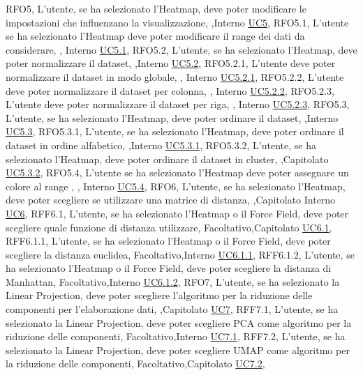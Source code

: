 {    {RFO5, L'utente{,} se ha selezionato l'Heatmap{,} deve poter modificare le impostazioni che influenzano la visualizzazione, \obb,Interno \noexpand\hyperref[uc5]{UC5}},
    {RFO5.1, L'utente se ha selezionato l'Heatmap deve poter modificare il range dei dati da considerare, \obb, Interno \noexpand\hyperref[uc5.1]{UC5.1}},
    {RFO5.2, L'utente{,} se ha selezionato l'Heatmap{,} deve poter normalizzare il dataset, \obb,Interno \noexpand\hyperref[uc5.2]{UC5.2}},
    {RFO5.2.1, L'utente deve poter normalizzare il dataset in modo globale, \obb, Interno \noexpand\hyperref[uc5.2.1]{UC5.2.1}},
    {RFO5.2.2, L'utente deve poter normalizzare il dataset per colonna, \obb, Interno \noexpand\hyperref[uc5.2.2]{UC5.2.2}},
    {RFO5.2.3, L'utente deve poter normalizzare il dataset per riga, \obb, Interno \noexpand\hyperref[uc5.2.3]{UC5.2.3}},
    {RFO5.3, L'utente{,} se ha selezionato l'Heatmap{,} deve poter ordinare il dataset, \obb,Interno \noexpand\hyperref[uc5.3]{UC5.3}},
    {RFO5.3.1, L'utente{,} se ha selezionato l'Heatmap{,} deve poter ordinare il dataset in ordine alfabetico, \obb,Interno \noexpand\hyperref[uc5.3.1]{UC5.3.1}},
    {RFO5.3.2, L'utente{,} se ha selezionato l'Heatmap{,} deve poter ordinare il dataset in cluster, \obb,Capitolato \noexpand\hyperref[uc5.3.2]{UC5.3.2}},
    {RFO5.4, L'utente se ha selezionato l'Heatmap deve poter assegnare un colore al range , \obb, Interno \noexpand\hyperref[uc5.4]{UC5.4}},
    {RFO6, L'utente{,} se ha selezionato l'Heatmap{,} deve poter scegliere se utilizzare una matrice di distanza, \obb,Capitolato Interno \noexpand\hyperref[uc6]{UC6}},
    {RFF6.1, L'utente{,} se ha selezionato l'Heatmap o il Force Field{,} deve poter scegliere quale funzione di distanza utilizzare, Facoltativo,Capitolato \noexpand\hyperref[uc6.1]{UC6.1}},
    {RFF6.1.1, L'utente{,} se ha selezionato l'Heatmap o il Force Field{,} deve poter scegliere la distanza euclidea, Facoltativo,Interno \noexpand\hyperref[uc6.1.1]{UC6.1.1}},
    {RFF6.1.2, L'utente{,} se ha selezionato l'Heatmap o il Force Field{,} deve poter scegliere la distanza di Manhattan, Facoltativo,Interno \noexpand\hyperref[uc6.1.2]{UC6.1.2}},
    {RFO7, L'utente{,} se ha selezionato la Linear Projection{,} deve poter scegliere l'algoritmo per la riduzione delle componenti per l'elaborazione dati, \obb,Capitolato \noexpand\hyperref[uc7]{UC7}},
    {RFF7.1, L'utente{,} se ha selezionato la Linear Projection{,} deve poter scegliere PCA come algoritmo per la riduzione delle componenti, Facoltativo,Interno \noexpand\hyperref[uc7.1]{UC7.1}},
    {RFF7.2, L'utente{,} se ha selezionato la Linear Projection{,} deve poter scegliere UMAP come algoritmo per la riduzione delle componenti, Facoltativo,Capitolato \noexpand\hyperref[uc7.2]{UC7.2}},
}
